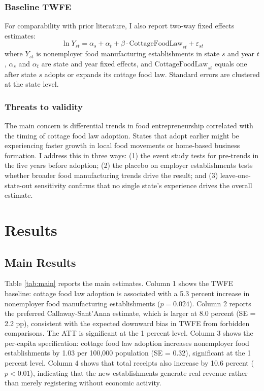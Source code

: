 \documentclass[12pt]{article}
\begin{document}
\subsubsection*{Baseline TWFE} For comparability with prior literature, I also report two-way fixed effects estimates:
\begin{equation}
\ln Y_{st} = \alpha_s + \alpha_t + \beta \cdot \text{CottageFoodLaw}_{st} + \varepsilon_{st}
\end{equation}
where $Y_{st}$ is nonemployer food manufacturing establishments in state $s$ and year $t$, $\alpha_s$ and $\alpha_t$ are state and year fixed effects, and $\text{CottageFoodLaw}_{st}$ equals one after state $s$ adopts or expands its cottage food law. Standard errors are clustered at the state level.

\subsubsection*{Threats to validity} The main concern is differential trends in food entrepreneurship correlated with the timing of cottage food law adoption. States that adopt earlier might be experiencing faster growth in local food movements or home-based business formation. I address this in three ways: (1) the event study tests for pre-trends in the five years before adoption; (2) the placebo on employer establishments tests whether broader food manufacturing trends drive the result; and (3) leave-one-state-out sensitivity confirms that no single state's experience drives the overall estimate.


\section{Results}

\subsection{Main Results}



Table \ref{tab:main} reports the main estimates. Column 1 shows the TWFE baseline: cottage food law adoption is associated with a 5.3 percent increase in nonemployer food manufacturing establishments ($p = 0.024$). Column 2 reports the preferred Callaway-Sant'Anna estimate, which is larger at 8.0 percent (SE = 2.2 pp), consistent with the expected downward bias in TWFE from forbidden comparisons. The ATT is significant at the 1 percent level. Column 3 shows the per-capita specification: cottage food law adoption increases nonemployer food establishments by 1.03 per 100,000 population (SE = 0.32), significant at the 1 percent level. Column 4 shows that total receipts also increase by 10.6 percent ($p < 0.01$), indicating that the new establishments generate real revenue rather than merely registering without economic activity.
\end{document}
